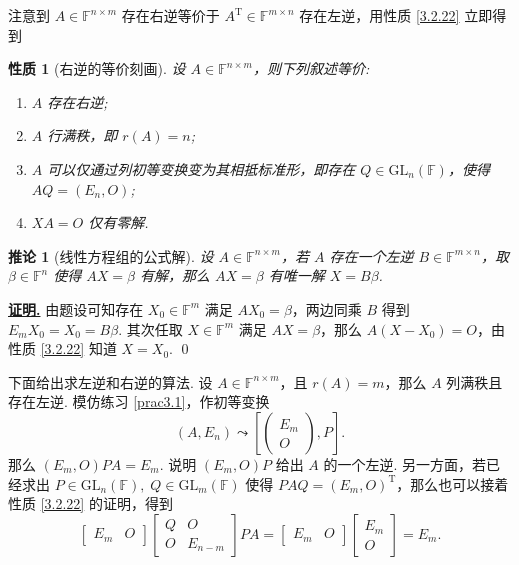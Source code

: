 \documentclass[10pt,openany]{article}
\theoremstyle{thmstyle} %
\theoremstyle{defstyle} %
\newtheorem{corollary}[theorem]{推论}
\theoremstyle{prostyle} %
\newtheorem{property}[theorem]{性质}
\theoremstyle{exastyle}
\theoremstyle{remstyle}
\renewenvironment{proof}[1][证明]{\par\underline{\textbf{#1.}} \;\fangsong}{\qed\par}
\newcommand{\T}{^{\text{T}}}
\newcommand{\F}{\mathbb{F}}
\newcommand{\gfn}{\text{GL}_n(\mathbb{F})}
\newcommand{\gfm}{\text{GL}_m(\mathbb{F})}
\newcommand{\mn}{^{m \times n}}
\newcommand{\nm}{^{n \times m}}
\begin{document}
注意到 \( A \in \F\nm \) 存在右逆等价于 \( A\T \in \F\mn \) 存在左逆，用性质  \ref{3.2.22} 立即得到

\begin{property}[右逆的等价刻画] \label{3.2.23}
	设 \( A \in \F\nm \)，则下列叙述等价:
	\begin{enumerate}[(1)]
		\item \( A \) 存在右逆;
		\item \( A \) 行满秩，即 \( r(A)=n \);
		\item \( A \) 可以仅通过列初等变换变为其相抵标准形，即存在 \( Q \in \gfn \)，使得 \( AQ=(E_n,O) \);
		\item \( XA=O \) 仅有零解.
	\end{enumerate}
\end{property}

\begin{corollary}[线性方程组的公式解] \label{3.2.24}
	设 \( A \in \F\nm \)，若 \( A \) 存在一个左逆 \( B \in \F\mn \)，取 \( \beta \in \F^n \) 使得 \( AX=\beta \) 有解，那么 \( AX=\beta \) 有唯一解 \( X=B \beta \).
\end{corollary}

\begin{proof}
	由题设可知存在 \( X_0 \in \F^m \) 满足 \( AX_0=\beta \)，两边同乘 \( B \) 得到 \( E_mX_0=X_0=B\beta \). 其次任取 \( X \in \F^m \) 满足 \( AX=\beta \)，那么 \( A(X-X_0)=O \)，由性质 \ref{3.2.22} 知道 \( X=X_0 \). 
\end{proof}

下面给出求左逆和右逆的算法. 设 \( A \in \F\nm \)，且 \( r(A)=m \)，那么 \( A \) 列满秩且存在左逆. 模仿练习 \ref{prac3.1}，作初等变换
\[ (A,E_n) \leadsto \left[ \begin{pmatrix}
	E_m \\ O
\end{pmatrix}, P \right]. \]
那么 \( (E_m,O)PA=E_m \). 说明 \( (E_m,O)P \) 给出 \( A \) 的一个左逆. 另一方面，若已经求出 \( P \in \gfn, \; Q \in \gfm \) 使得 \( PAQ=(E_m,O)\T \)，那么也可以接着性质 \ref{3.2.22} 的证明，得到
\[ \begin{bmatrix}
	E_m & O
\end{bmatrix}\begin{bmatrix}
Q & O \\
O & E_{n-m}
\end{bmatrix}PA=\begin{bmatrix}
E_m & O
\end{bmatrix}\begin{bmatrix}
E_m \\ O
\end{bmatrix}=E_m. \]
\end{document}
